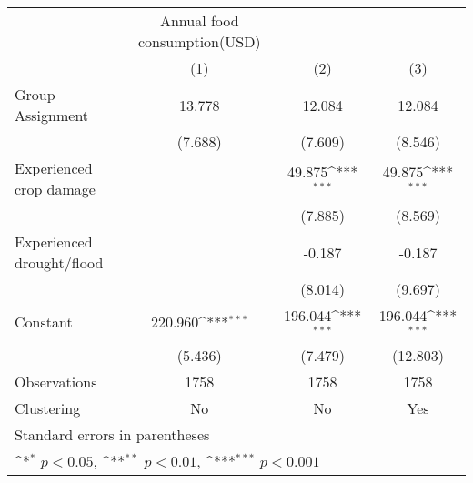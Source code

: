 {
\def\sym#1{\ifmmode^{#1}\else\(^{#1}\)\fi}
\begin{tabular}{l*{3}{c}}
\hline\hline
                    &Annual food consumption(USD)                                     \\
                    &\multicolumn{1}{c}{(1)}         &\multicolumn{1}{c}{(2)}         &\multicolumn{1}{c}{(3)}         \\
\hline
Group Assignment    &      13.778         &      12.084         &      12.084         \\
                    &     (7.688)         &     (7.609)         &     (8.546)         \\
[1em]
Experienced crop damage&                     &      49.875\sym{***}&      49.875\sym{***}\\
                    &                     &     (7.885)         &     (8.569)         \\
[1em]
Experienced drought/flood&                     &      -0.187         &      -0.187         \\
                    &                     &     (8.014)         &     (9.697)         \\
[1em]
Constant            &     220.960\sym{***}&     196.044\sym{***}&     196.044\sym{***}\\
                    &     (5.436)         &     (7.479)         &    (12.803)         \\
\hline
Observations        &        1758         &        1758         &        1758         \\
Clustering          &          No         &          No         &         Yes         \\
\hline\hline
\multicolumn{4}{l}{\footnotesize Standard errors in parentheses}\\
\multicolumn{4}{l}{\footnotesize \sym{*} \(p<0.05\), \sym{**} \(p<0.01\), \sym{***} \(p<0.001\)}\\
\end{tabular}
}

